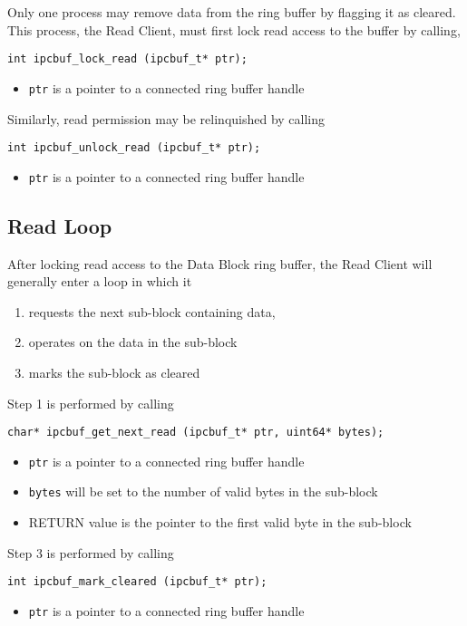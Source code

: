 Only one process may remove data from the ring buffer by flagging it
as cleared.  This process, the Read Client, must first lock read
access to the buffer by calling,
\begin{verbatim}
int ipcbuf_lock_read (ipcbuf_t* ptr);
\end{verbatim}
\vspace{-3mm}
\begin{itemize}
\item {\tt ptr} is a pointer to a connected ring buffer handle
\end{itemize}
Similarly, read permission may be relinquished by calling
\begin{verbatim}
int ipcbuf_unlock_read (ipcbuf_t* ptr);
\end{verbatim}
\vspace{-3mm}
\begin{itemize}
\item {\tt ptr} is a pointer to a connected ring buffer handle
\end{itemize}

\subsection{Read Loop}

After locking read access to the Data Block ring buffer, the Read Client
will generally enter a loop in which it
\begin{enumerate}
\item requests the next sub-block containing data, 
\item operates on the data in the sub-block
\item marks the sub-block as cleared
\end{enumerate}
Step 1 is performed by calling
\begin{verbatim}
char* ipcbuf_get_next_read (ipcbuf_t* ptr, uint64* bytes);
\end{verbatim}
\vspace{-3mm}
\begin{itemize}
\item {\tt ptr} is a pointer to a connected ring buffer handle
\item {\tt bytes} will be set to the number of valid bytes in the sub-block
\item RETURN value is the pointer to the first valid byte in the sub-block
\end{itemize}
Step 3 is performed by calling
\begin{verbatim}
int ipcbuf_mark_cleared (ipcbuf_t* ptr);
\end{verbatim}
\vspace{-3mm}
\begin{itemize}
\item {\tt ptr} is a pointer to a connected ring buffer handle
\end{itemize}


